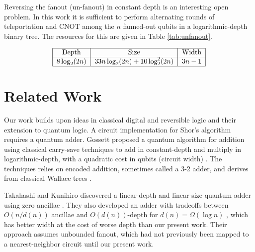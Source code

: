 \documentclass[twoside]{article}
\begin{document}
Reversing the fanout (un-fanout) in constant depth is an interesting
open problem.
In this work it is sufficient to perform alternating rounds of
teleportation and CNOT among the $n$ fanned-out qubits in a logarithmic-depth
binary tree. The resources for this are given in
Table \ref{tab:unfanout}.

\begin{table}
\begin{displaymath}
\begin{tabular}{|c|c|c|}
\hline
\text{Depth} & \text{Size} & \text{Width}\\
\hline
$8\log_2(2n)$ & $33n\log_2(2n) + 10\log^2_2(2n)$ & $3n-1$ \\
\hline
\end{tabular}
\end{displaymath}
\centerline{}
\label{tab:unfanout}
\end{table}


%
\section{Related Work}
\label{sec:related}

Our work builds upon ideas in classical digital and reversible logic and their extension to quantum logic.
A circuit implementation for Shor's algorithm requires a quantum adder.
Gossett proposed a quantum algorithm for addition using classical carry-save techniques to add
in constant-depth and multiply in logarithmic-depth, with a quadratic
cost in qubits (circuit width) \cite{Gossett1998}. The techniques relies on encoded addition, sometimes
called a 3-2 adder, and derives from classical Wallace trees \cite{Wallace1964}.

Takahashi and Kunihiro discovered a linear-depth
and linear-size quantum adder using zero ancillae \cite{Takahashi2005}.
They also developed an adder with tradeoffs between $O(n/d(n))$ ancillae and
$O(d(n))$-depth for $d(n) = \Omega(\log n)$ \cite{Takahashi2009}, which has
better width at the cost of worse depth than our present work. 
Their approach assumes unbounded fanout, which had not previously been mapped to a
nearest-neighbor circuit until our present work.
\end{document}
